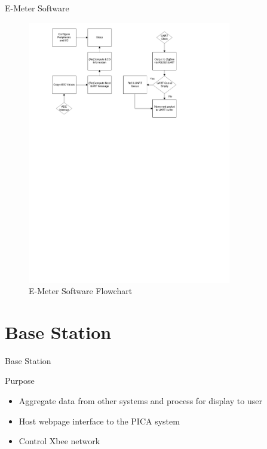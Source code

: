 \documentclass{beamer}
\begin{document}
\begin{frame}{E-Meter Software}
	\begin{figure}[htbp]
	\begin{center}
	\includegraphics[width=3.5in]{includes/E_Meter_Software_Flowchart}
	\caption{E-Meter Software Flowchart}
	\label{fig:e_meter_software_flow}
	\end{center}
	\end{figure}
\end{frame}

\section{Base Station}
\begin{frame}{Base Station}
	\begin{block}{Purpose}
		\begin{itemize}
		\item <1 -> Aggregate data from other systems and process for display to user
		\item <2 -> Host webpage interface to the PICA system
		\item <3 -> Control Xbee network
		\end{itemize}
	\end{block}
\end{frame}
\end{document}
